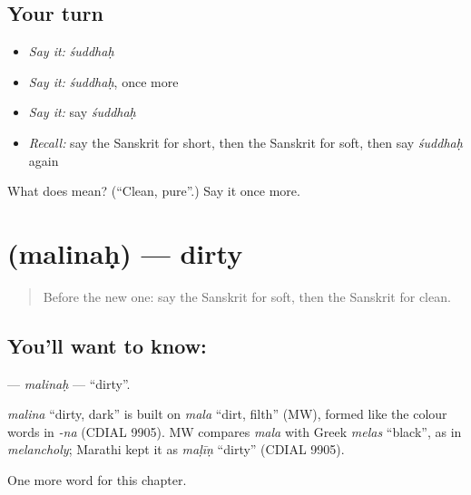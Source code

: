 \subsection*{Your turn}
\begin{itemize}
\raggedright
  \item \emph{Say it:} \emph{śuddhaḥ}
  \item \emph{Say it:} \emph{śuddhaḥ}, once more
  \item \emph{Say it:} say \emph{śuddhaḥ}
  \item \emph{Recall:} say the Sanskrit for short, then the Sanskrit for soft, then say \emph{śuddhaḥ} again
\end{itemize}

\begin{tcolorbox}[breakable,colback=teal!4,colframe=teal!35!black,title={Before you move on}]
What does  mean? (\textquotedblleft{}Clean, pure\textquotedblright{}.) Say it once more.
\end{tcolorbox}
\section[\texorpdfstring{\sk{मलिनः} (malinaḥ)}{मलिनः (malinaḥ)}]{ (malinaḥ) — dirty}

\label{lesson:SA-C125-malinah}



\begin{quote}
Before the new one: say the Sanskrit for soft, then the Sanskrit for clean.
\end{quote}

\subsection*{You'll want to know: }
\textbf{} — \emph{malinaḥ} — \textquotedblleft{}dirty\textquotedblright{}.

\begin{cousinweb}
\emph{malina} \textquotedblleft{}dirty, dark\textquotedblright{} is built on \emph{mala} \textquotedblleft{}dirt, filth\textquotedblright{} (MW), formed like the colour words in \emph{-na} (CDIAL 9905). MW compares \emph{mala} with Greek \emph{melas} \textquotedblleft{}black\textquotedblright{}, as in \emph{melancholy}; Marathi kept it as \emph{maḷīṇ} \textquotedblleft{}dirty\textquotedblright{} (CDIAL 9905).
\end{cousinweb}

\begin{grammarlens}[title={What you've built}]
One more word for this chapter.
\end{grammarlens}

